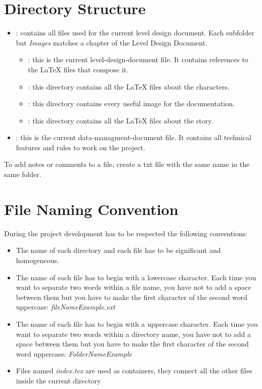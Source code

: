 \documentclass[12pt]{article}
\begin{document}
\section{Directory Structure}
\begin{itemize}
\item \textbf{}: contains all files used for the current level design document. Each subfolder but \textit{Images} matches a chapter of the Level Design Document.
  \begin{itemize}
    \item \textbf{}: this is the current level-design-document file. It contains references to the LaTeX files that compose it.

    \item \textbf{}: this directory contains all the LaTeX files about the characters.

    \item \textbf{}: this directory contains every useful image for the documentation.

    \item \textbf{}: this directory contains all the LaTeX files about the story.
  \end{itemize}
  \item \textbf{}: this is the current data-managment-document file. It contains all technical features and rules to work on the project.
\end{itemize}

To add notes or comments to a file, create a txt file with the same name in the same folder.

\section{File Naming Convention}
During the project development has to be respected the following conventions:
\begin{itemize}
  \item The name of each directory and each file has to be significant and homogeneous.
  \item The name of each file has to begin with a lowercase character. Each time you want to separate two words within a file name, you have not to add a space between them but you have to make the first character of the second word uppercase: \textit{fileNameExample.ext}
  \item The name of each file has to begin with a uppercase character. Each time you want to separate two words within a directory name, you have not to add a space between them but you have to make the first character of the second word uppercase: \textit{FolderNameExample}
   \item Files named \textit{index.tex} are used as containers, they connect all the other files inside the current directory
\end{itemize}
\end{document}
